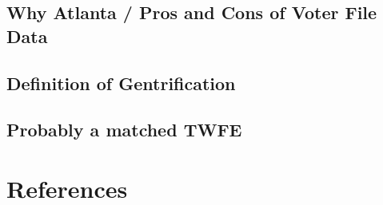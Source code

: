 \documentclass[
  12pt,
]{article}
\begin{document}
\hypertarget{why-atlanta-pros-and-cons-of-voter-file-data}{%
\subsection*{Why Atlanta / Pros and Cons of Voter File Data}\label{why-atlanta-pros-and-cons-of-voter-file-data}}

\hypertarget{definition-of-gentrification}{%
\subsection*{Definition of Gentrification}\label{definition-of-gentrification}}

\hypertarget{probably-a-matched-twfe}{%
\subsection*{Probably a matched TWFE}\label{probably-a-matched-twfe}}

\newpage

\hypertarget{references}{%
\section*{References}\label{references}}
\end{document}
